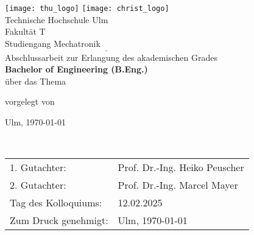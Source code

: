 
\begin{titlepage}
	\thispagestyle{empty}
	\makeatletter %
	
	{\centering
	\texttt{[image: thu\_logo]}\hspace{4cm}
	\texttt{[image: christ\_logo]}
	\\\vspace{3cm}
	Technische Hochschule Ulm\\
	Fakultät T\\
	Studiengang Mechatronik
	\\\vspace{1.5cm}
	$\underline{\hspace{10cm}}$
	\\\vspace{1.5cm}
	Abschlussarbeit zur Erlangung des akademischen Grades
	\\\vspace{3mm}
	{\bfseries{\large Bachelor of Engineering (B.Eng.)}}
	\\\vspace{10mm}
	über das Thema
	\\\vspace{10mm}
	\begin{spacing}{2}
			{\bfseries{\Large \@title}}
	\end{spacing}
	\vspace{10em}
	vorgelegt von\\
	\@author
	\vfill
	\vfill

	{\begin{center}
			Ulm, \today
	\end{center}
	}
}
\newpage
\thispagestyle{empty}
~ %
\vfill

\begingroup
\renewcommand{\arraystretch}{1.5} %
\begin{tabular}{ l l }
1. Gutachter: & Prof. Dr.-Ing. Heiko Peuscher\\
2. Gutachter: & Prof. Dr.-Ing. Marcel Mayer\\
[2cm]
Tag des Kolloquiums: & 12.02.2025\\
Zum Druck genehmigt: & Ulm, \today\\
\end{tabular}
\endgroup



\end{titlepage}